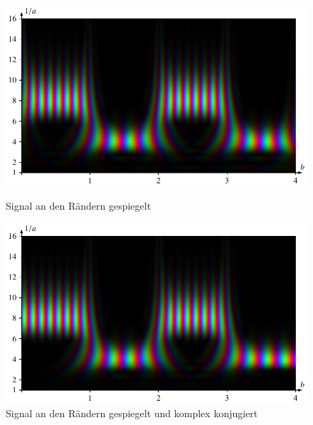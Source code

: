 \begin{figure}
	\centering
	\includegraphics[width=\linewidth, keepaspectratio]{papers/complex/images/padding_sym.pdf}
	\caption{Signal an den Rändern gespiegelt} \label{complex:padding-sym}
	\includegraphics[width=\linewidth, keepaspectratio]{papers/complex/images/padding_sym_conj.pdf}
	\caption{Signal an den Rändern gespiegelt und komplex konjugiert} \label{complex:padding-sym-conj}
\end{figure}
